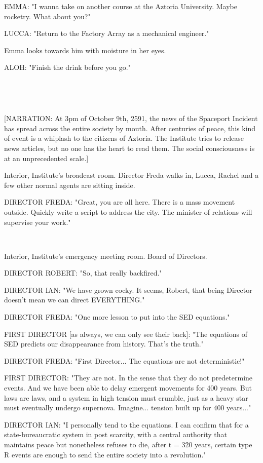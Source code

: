 \documentclass[11pt]{article}
\begin{document}
EMMA: "I wanna take on another course at the Aztoria University.
Maybe rocketry. 
What about you?"

LUCCA: "Return to the Factory Array as a mechanical engineer."

Emma looks towards him with moisture in her eyes.

ALOH: "Finish the drink before you go."

\ 

\ 

[NARRATION: At 3pm of October 9th, 2591, the news of the Spaceport Incident has spread across the entire society by mouth.
After centuries of peace, this kind of event is a whiplash to the citizens of Aztoria.
The Institute tries to release news articles, but no one has the heart to read them.
The social consciousness is at an unprecedented scale.]

Interior, Institute's broadcast room.
Director Freda walks in, Lucca, Rachel and a few other normal agents are sitting inside.

DIRECTOR FREDA: "Great, you are all here.
There is a mass movement outside.
Quickly write a script to address the city. 
The minister of relations will supervise your work."

\ 

Interior, Institute's emergency meeting room. 
Board of Directors. 

DIRECTOR ROBERT: "So, that really backfired."

DIRECTOR IAN: "We have grown cocky.
It seems, Robert, that being Director doesn't mean we can direct EVERYTHING."

DIRECTOR FREDA: "One more lesson to put into the SED equations."

FIRST DIRECTOR [as always, we can only see their back]: "The equations of SED predicts our disappearance from history.
That's the truth."

DIRECTOR FREDA: "First Director... The equations are not deterministic!"

FIRST DIRECTOR: "They are not. In the sense that they do not predetermine events.
And we have been able to delay emergent movements for 400 years.
But laws are laws, and a system in high tension must crumble, just as a heavy star must eventually undergo supernova.
Imagine... tension built up for 400 years..."

DIRECTOR IAN: "I personally tend to the equations. 
I can confirm that for a state-bureaucratic system in post scarcity, with a central authority that maintains peace but nonetheless refuses to die, after t = 320 years, certain type R events are enough to send the entire society into a revolution."
\end{document}
